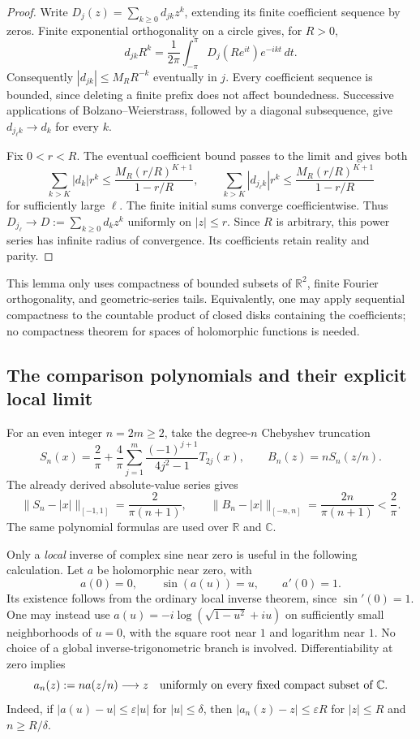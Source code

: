 \documentclass[11pt]{article}
\newcommand{\R}{\mathbb R}
\newcommand{\C}{\mathbb C}
\theoremstyle{remark}
\numberwithin{equation}{section}
\begin{document}
\begin{proof}
Write $D_j(z)=\sum_{k\ge0}d_{jk}z^k$, extending its finite coefficient
sequence by zeros.  Finite exponential orthogonality on a circle gives,
for $R>0$,
\[
 d_{jk}R^k=\frac1{2\pi}\int_{-\pi}^{\pi}
 D_j(Re^{it})e^{-ikt}\,dt.
\]
Consequently $|d_{jk}|\le M_RR^{-k}$ eventually in $j$.
Every coefficient sequence is bounded, since deleting a finite prefix
does not affect boundedness.  Successive applications of
Bolzano--Weierstrass, followed by a diagonal subsequence, give
$d_{j_\ell k}\to d_k$ for every $k$.

Fix $0<r<R$.  The eventual coefficient bound passes to the limit and
gives both
\[
 \sum_{k>K}|d_k|r^k
 \le\frac{M_R(r/R)^{K+1}}{1-r/R},\qquad
 \sum_{k>K}|d_{j_\ell k}|r^k
 \le\frac{M_R(r/R)^{K+1}}{1-r/R}
\]
for sufficiently large $\ell$.  The finite initial sums converge
coefficientwise.  Thus $D_{j_\ell}\to D:=\sum_{k\ge0}d_kz^k$ uniformly
on $|z|\le r$.  Since $R$ is arbitrary, this power series has infinite
radius of convergence.  Its coefficients retain reality and parity.
\end{proof}

This lemma only uses compactness of bounded subsets of $\R^2$, finite
Fourier orthogonality, and geometric-series tails.  Equivalently, one
may apply sequential compactness to the countable product of closed
disks containing the coefficients; no compactness theorem for spaces
of holomorphic functions is needed.

\subsection{The comparison polynomials and their explicit local limit}
\label{polyretry:comparison-limit}

For an even integer $n=2m\ge2$, take the degree-$n$ Chebyshev truncation
\[
 S_n(x)=\frac2\pi+
 \frac4\pi\sum_{j=1}^{m}
 \frac{(-1)^{j+1}}{4j^2-1}T_{2j}(x),
 \qquad B_n(z)=nS_n(z/n).
\]
The already derived absolute-value series gives
\begin{equation}\label{polyretry:comparison-real-error}
 \|S_n-|x|\|_{[-1,1]}=\frac{2}{\pi(n+1)},
 \qquad
 \|B_n-|x|\|_{[-n,n]}=\frac{2n}{\pi(n+1)}<\frac2\pi.
\end{equation}
The same polynomial formulas are used over $\R$ and $\C$.

Only a \emph{local} inverse of complex sine near zero is useful in the
following calculation.  Let $a$ be holomorphic near zero, with
\[
 a(0)=0,\qquad \sin(a(u))=u,\qquad a'(0)=1.
\]
Its existence follows from the ordinary local inverse theorem, since
$\sin'(0)=1$.  One may instead use
$a(u)=-i\log(\sqrt{1-u^2}+iu)$ on sufficiently small neighborhoods of
$u=0$, with the square root near $1$ and logarithm near $1$.
No choice of a global inverse-trigonometric branch is involved.
Differentiability at zero implies
\begin{equation}\label{polyretry:local-inverse-scaling}
 a_n(z):=n a(z/n)\longrightarrow z
 \quad\hbox{uniformly on every fixed compact subset of $\C$}.
\end{equation}
Indeed, if $|a(u)-u|\le\varepsilon|u|$ for $|u|\le\delta$, then
$|a_n(z)-z|\le\varepsilon R$ for $|z|\le R$ and $n\ge R/\delta$.
\end{document}
